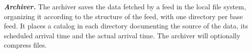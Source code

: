 


    


\textbf{\textit{Archiver.}} The archiver saves the data fetched by a feed 
in the local file system, organizing it according to the structure
of the feed, with one directory per base feed.  
It places a catalog in each directory documenting the source of 
the data, its scheduled arrival time and the
actual arrival time. The archiver will optionally compress
files.

